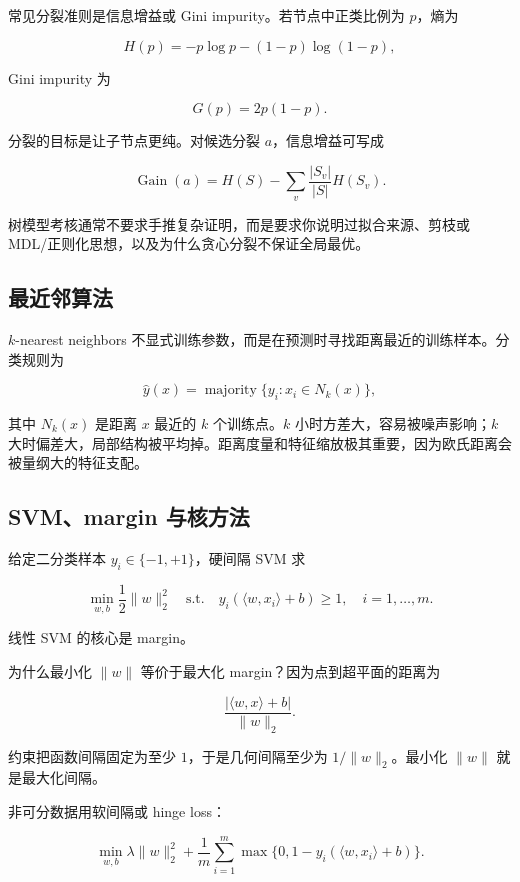 \documentclass[11pt]{ctexart}
\begin{document}
常见分裂准则是信息增益或 Gini impurity。若节点中正类比例为 \(p\)，熵为

\[
  H(p)=-p\log p-(1-p)\log(1-p),
\]

Gini impurity 为

\[
  G(p)=2p(1-p).
\]

分裂的目标是让子节点更纯。对候选分裂 \(a\)，信息增益可写成

\[
  \operatorname{Gain}(a)
  =
  H(S)
  -
  \sum_{v}
  \frac{|S_v|}{|S|}
  H(S_v).
\]

树模型考核通常不要求手推复杂证明，而是要求你说明过拟合来源、剪枝或 MDL/正则化思想，以及为什么贪心分裂不保证全局最优。

\subsection{最近邻算法}

\(k\)-nearest neighbors 不显式训练参数，而是在预测时寻找距离最近的训练样本。分类规则为

\[
  \hat y(x)
  =
  \operatorname{majority}
  \{y_i:x_i\in N_k(x)\},
\]

其中 \(N_k(x)\) 是距离 \(x\) 最近的 \(k\) 个训练点。\(k\) 小时方差大，容易被噪声影响；\(k\) 大时偏差大，局部结构被平均掉。距离度量和特征缩放极其重要，因为欧氏距离会被量纲大的特征支配。

\subsection{SVM、margin 与核方法}


\begin{definition}
给定二分类样本 \(y_i\in\{-1,+1\}\)，硬间隔 SVM 求

\[
  \min_{w,b}\frac12\|w\|_2^2
  \quad
  \text{s.t.}
  \quad
  y_i(\langle w,x_i\rangle+b)\ge 1,\quad i=1,\ldots,m.
\]
\end{definition}

线性 SVM 的核心是 margin。

为什么最小化 \(\|w\|\) 等价于最大化 margin？因为点到超平面的距离为

\[
  \frac{|\langle w,x\rangle+b|}{\|w\|_2}.
\]

约束把函数间隔固定为至少 \(1\)，于是几何间隔至少为 \(1/\|w\|_2\)。最小化 \(\|w\|\) 就是最大化间隔。

非可分数据用软间隔或 hinge loss：

\[
  \min_{w,b}
  \lambda\|w\|_2^2
  +
  \frac1m
  \sum_{i=1}^{m}
  \max\{0,1-y_i(\langle w,x_i\rangle+b)\}.
\]
\end{document}
